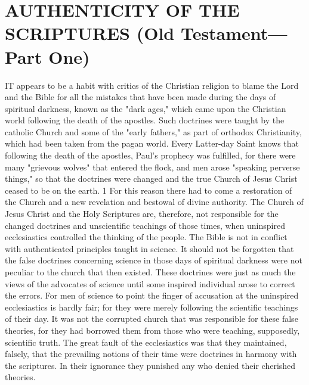 \chapter{AUTHENTICITY OF THE SCRIPTURES (Old Testament—Part One)}

IT appears to be a habit with critics of the Christian religion to blame the Lord and the Bible
for all the mistakes that have been made during the days of spiritual darkness, known as the
"dark ages," which came upon the Christian world following the death of the apostles. Such
doctrines were taught by the catholic Church and some of the "early fathers," as part of
orthodox Christianity, which had been taken from the pagan world. Every Latter-day Saint
knows that following the death of the apostles, Paul's prophecy was fulfilled, for there were
many "grievous wolves" that entered the flock, and men arose "speaking perverse things," so
that the doctrines were changed and the true Church of Jesus Christ ceased to be on the earth.
1 For this reason there had to come a restoration of the Church and a new revelation and
bestowal of divine authority. The Church of Jesus Christ and the Holy Scriptures are,
therefore, not responsible for the changed doctrines and unscientific teachings of those times,
when uninspired ecclesiastics controlled the thinking of the people. The Bible is not in
conflict with authenticated principles taught in science. It should not be forgotten that the
false doctrines concerning science in those days of spiritual darkness were not peculiar to the
church that then existed. These doctrines were just as much the views of the advocates of
science until some inspired individual arose to correct the errors. For men of science to point
the finger of accusation at the uninspired ecclesiastics is hardly fair; for they were merely
following the scientific teachings of their day. It was not the corrupted church that was
responsible for these false theories, for they had borrowed them from those who were
teaching, supposedly, scientific truth. The great fault of the ecclesiastics was that they
maintained, falsely, that the prevailing notions of their time were doctrines in harmony with
the scriptures. In their ignorance they punished any who denied their cherished theories.

